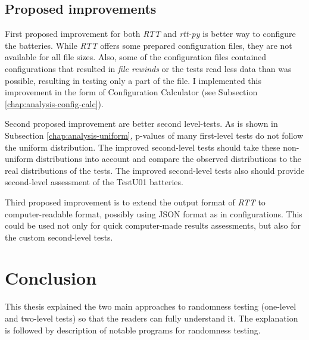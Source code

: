 \documentclass[
  digital,     %
  oneside,     %
  nosansbold,  %
  nocolorbold, %
  nolof,         %
  nolot,         %
]{fithesis4}
\begin{document}
\section{Proposed improvements}
First proposed improvement for both \emph{RTT} and \emph{rtt-py} is better way to configure the batteries. While \emph{RTT} offers some prepared configuration files, they are not available for all file sizes. Also, some of the configuration files contained configurations that resulted in \emph{file rewinds} or the tests read less data than was possible, resulting in testing only a part of the file. I implemented this improvement in the form of Configuration Calculator (see Subsection \ref{chap:analysis-config-calc}).

Second proposed improvement are better second level-tests. As is shown in Subsection \ref{chap:analysis-uniform}, p-values of many first-level tests do not follow the uniform distribution. The improved second-level tests should take these non-uniform distributions into account and compare the observed distributions to the real distributions of the tests. The improved second-level tests also should provide second-level assessment of the TestU01 batteries.

Third proposed improvement is to extend the output format of \emph{RTT} to computer-readable format, possibly using JSON format as in configurations. This could be used not only for quick computer-made results assessments, but also for the custom second-level tests.


\chapter{Conclusion}


This thesis explained the two main approaches to randomness testing (one-level and two-level tests) so that the readers can fully understand it. The explanation is followed by description of notable programs for randomness testing.
\end{document}
